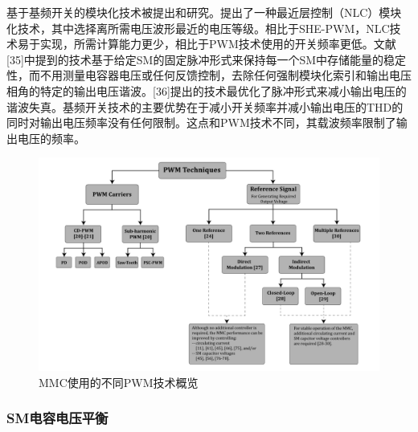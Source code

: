   基于基频开关的模块化技术被提出和研究。提出了一种最近层控制（NLC）模块化技术，其中选择离所需电压波形最近的电压等级。相比于SHE-PWM，NLC技术易于实现，所需计算能力更少，相比于PWM技术使用的开关频率更低。文献[35]中提到的技术基于给定SM的固定脉冲形式来保持每一个SM中存储能量的稳定性，而不用测量电容器电压或任何反馈控制，去除任何强制模块化索引和输出电压相角的特定的输出电压谐波。[36]提出的技术最优化了脉冲形式来减小输出电压的谐波失真。基频开关技术的主要优势在于减小开关频率并减小输出电压的THD的同时对输出电压频率没有任何限制。这点和PWM技术不同，其载波频率限制了输出电压的频率。
\begin{figure}[H]
\centering
\includegraphics[width=1.05\textwidth]{images/Paper_Fig_5.png}
\setcaptionwidth{\linewidth}
\caption{MMC使用的不同PWM技术概览}
\end{figure}
  
  \subsubsection{SM电容电压平衡}
  
